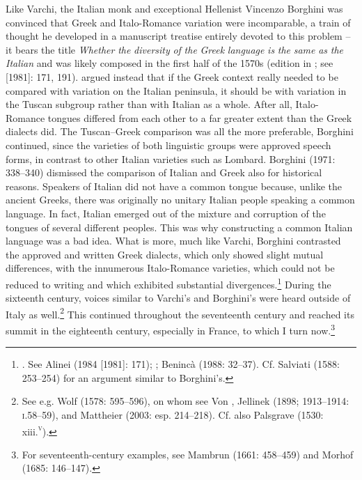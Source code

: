 \documentclass[output=paper]{langsci/langscibook}
\begin{document}
Like Varchi, the Italian monk and exceptional Hellenist Vincenzo Borghini was convinced that Greek and Italo-Romance variation were incomparable, a train of thought he developed in a manuscript treatise entirely devoted to this problem – it bears the title \textit{Whether} \textit{the} \textit{diversity} \textit{of} \textit{the} \textit{Greek} \textit{language} \textit{is} \textit{the} \textit{same} \textit{as} \textit{the} \textit{Italian} and was likely composed in the first half of the 1570s (edition in \citealt{Borghini1971}; see \citealt{Alinei1984} [1981]: 171, 191). \citet[335]{Borghini1971} argued instead that if the Greek context really needed to be compared with variation on the Italian peninsula, it should be with variation in the Tuscan subgroup rather than with Italian as a whole. After all, Italo-Romance tongues differed from each other to a far greater extent than the Greek dialects did. The Tuscan–Greek comparison was all the more preferable, Borghini continued, since the varieties of both linguistic groups were approved speech forms, in contrast to other Italian varieties such as Lombard. Borghini (1971: 338–340) dismissed the comparison of Italian and Greek also for historical reasons. Speakers of Italian did not have a common tongue because, unlike the ancient Greeks, there was originally no unitary Italian people speaking a common language. In fact, Italian emerged out of the mixture and corruption of the tongues of several different peoples. This was why constructing a common Italian language was a bad idea. What is more, much like Varchi, Borghini contrasted the approved and written Greek dialects, which only showed slight mutual differences, with the innumerous Italo-Romance varieties, which could not be reduced to writing and which exhibited substantial divergences.\footnote{\citet[341]{Borghini1971}. See Alinei (1984 [1981]: 171); \citet[210]{Trovato1984}; Benincà (1988: 32–37). Cf. Salviati (1588: 253–254) for an argument similar to Borghini’s.} During the sixteenth century, voices similar to Varchi’s and Borghini’s were heard outside of Italy as well.\footnote{See e.g. Wolf (1578: 595–596), on whom see Von \citet{Raumer1856}, Jellinek (1898; 1913–1914: \textsc{i}.58–59), and Mattheier (2003: esp. 214–218). Cf. also Palsgrave (1530: xiii.\textsc{\textsuperscript{v}}).} This continued throughout the seventeenth century and reached its summit in the eighteenth century, especially in France, to which I turn now.\footnote{For seventeenth-century examples, see Mambrun (1661: 458–459) and Morhof (1685: 146–147).}
\end{document}
